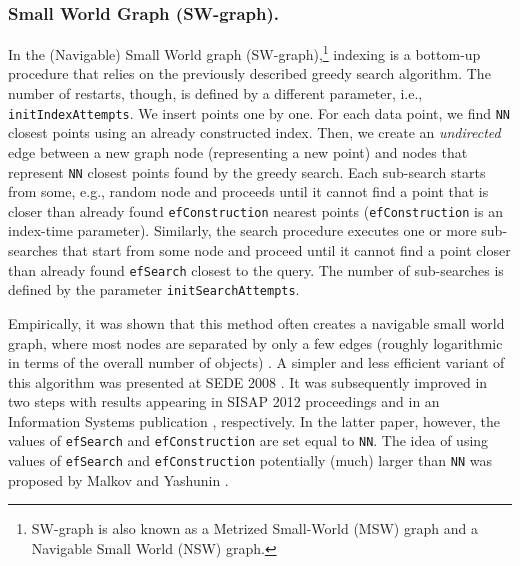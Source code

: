 \documentclass[runningheads,a4paper]{llncs}
\newcommand{\ttt}[1]{\texttt{#1}}
\begin{document}
\subsubsection{Small World Graph (SW-graph).} \label{SectionSWGraph}
In the (Navigable) Small World graph (SW-graph),\footnote{SW-graph is also known as a Metrized Small-World (MSW) graph
and a Navigable Small World (NSW) graph.}
indexing is a bottom-up procedure that relies on the previously described greedy search algorithm.  
The number of restarts, though, is defined by a different parameter, i.e., \ttt{initIndexAttempts}.
We insert points one by one. For each data point, 
we find \ttt{NN} closest points using an already constructed index.
Then, we create an \emph{undirected} edge between a new graph node (representing a new point) 
and nodes that represent \ttt{NN} closest points found by the greedy search. 
Each sub-search starts from some, e.g., random node and proceeds until it cannot find a point that is closer
than already found \ttt{efConstruction} nearest points (\ttt{efConstruction} is an index-time parameter).
Similarly, the search procedure executes one or more sub-searches that start from some node and proceed
until it cannot find a point closer than already found \ttt{efSearch} closest to the query.
The number of sub-searches is defined by the parameter \ttt{initSearchAttempts}.

Empirically, it was shown that this method often creates a navigable small world graph, where most nodes are separated by only a few edges (roughly logarithmic in terms of the overall number of objects) \cite{malkov2012scalable}.
A simpler and less efficient variant of this algorithm was presented at SEDE 2008 \cite{krylov2008metrized}.
It was subsequently improved in two steps with results appearing in SISAP 2012 proceedings \cite{malkov2012scalable}
and in an Information Systems publication \cite{malkov2014}, respectively.
In the latter paper, however, the values of \ttt{efSearch} and \ttt{efConstruction} are set equal to \ttt{NN}.
The idea of using values of \ttt{efSearch} and \ttt{efConstruction} potentially (much) larger than \ttt{NN}
was proposed by Malkov and Yashunin \cite{Malkov2016}.
\end{document}
